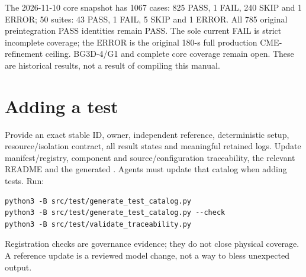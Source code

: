 The 2026-11-10 core snapshot has 1067 cases: 825 PASS, 1 FAIL, 240 SKIP and
1 ERROR; 50 suites: 43 PASS, 1 FAIL, 5 SKIP and 1 ERROR.
All 785 original preintegration PASS identities remain PASS. The sole current
FAIL is strict incomplete coverage; the ERROR is the original 180-s full
production CME-refinement ceiling. BG3D-4/G1 and complete core coverage remain
open. These are historical results, not a result of compiling this manual.

\section{Adding a test}
Provide an exact stable ID, owner, independent reference, deterministic setup,
resource/isolation contract, all result states and meaningful retained logs.
Update manifest/registry, component and source/configuration traceability,
the relevant README and the generated .
Agents must update that catalog when adding tests. Run:
\begin{lstlisting}
python3 -B src/test/generate_test_catalog.py
python3 -B src/test/generate_test_catalog.py --check
python3 -B src/test/validate_traceability.py
\end{lstlisting}
Registration checks are governance evidence; they do not close physical
coverage. A reference update is a reviewed model change, not a way to bless
unexpected output.
